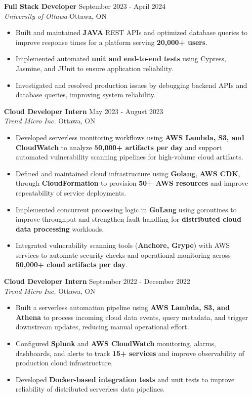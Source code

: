 \documentclass[a4paper]{article}
\begin{document}
\textbf{Full Stack Developer} \hfill September 2023 - April 2024\\
\textit{University of Ottawa} \hfill Ottawa, ON\\
\vspace{-2mm}
\begin{itemize} \itemsep -2pt
    \item Built and maintained \textbf{JAVA} REST APIs and optimized database queries to improve response times for a platform serving \textbf{20,000+ users}.
    \item Implemented automated \textbf{unit and end-to-end tests} using Cypress, Jasmine, and JUnit to ensure application reliability.
    \item Investigated and resolved production issues by debugging backend APIs and database queries, improving system reliability.
\end{itemize}
\textbf{Cloud Developer Intern} \hfill May 2023 - August 2023\\
\textit{Trend Micro Inc.} \hfill Ottawa, ON\\
\vspace{-2mm}
\begin{itemize} \itemsep -2pt
    \item Developed serverless monitoring workflows using \textbf{AWS Lambda, S3, and CloudWatch} to analyze \textbf{50,000+ artifacts per day} and support automated vulnerability scanning pipelines for high-volume cloud artifacts.
\item Defined and maintained cloud infrastructure using \textbf{Golang}, \textbf{AWS CDK}, through \textbf{CloudFormation} to provision \textbf{50+ AWS resources} and improve repeatability of service deployments.
\item Implemented concurrent processing logic in \textbf{GoLang} using goroutines to improve throughput and strengthen fault handling for \textbf{distributed cloud data processing} workloads.
\item Integrated vulnerability scanning tools (\textbf{Anchore, Grype}) with AWS services to automate security checks and operational monitoring across \textbf{50,000+ cloud artifacts per day}.
\end{itemize}
\textbf{Cloud Developer Intern} \hfill September 2022 - December 2022\\
\textit{Trend Micro Inc.} \hfill Ottawa, ON\\
\vspace{-2mm}
\begin{itemize} \itemsep -2pt
        \item Built a serverless automation pipeline using \textbf{AWS Lambda, S3, and Athena} to process incoming cloud data events, query metadata, and trigger downstream updates, reducing manual operational effort.
\item Configured \textbf{Splunk} and \textbf{AWS CloudWatch} monitoring, alarms, dashboards, and alerts to track \textbf{15+ services} and improve observability of production cloud infrastructure.
\item Developed \textbf{Docker-based integration tests} and unit tests to improve reliability of distributed serverless data pipelines.
\end{itemize}
\vspace{5mm}
\end{document}
